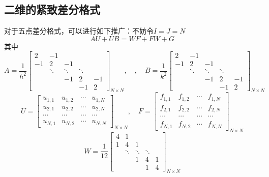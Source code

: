 \documentclass[fontset=mac]{ctexart}
\begin{document}
	\subsection{二维的紧致差分格式}
	对于五点差分格式，可以进行如下推广：不妨令$I=J=N$
	$$
	A U+U B=W F+F W+G
	$$
	其中
	$$
	A=\frac{1}{h^{2}}\left[\begin{array}{ccccc}
		2 & -1 & & & \\
		 -1 & 2 & -1 & & \\ 
		 & \ddots & \ddots & \ddots & \\ 
		 & & -1 & 2 & -1 \\
		  & & & -1 & 2\end{array}
	  \right]_{N \times N}, \quad, 
	  \quad B=\frac{1}{k^{2}}\left[\begin{array}{ccccc}
	  	2 & -1 & & & \\
	  	 -1 & 2 & -1 & & \\
	  	  & \ddots & \ddots & \ddots & \\
	  	   & & -1 & 2 & -1 \\ 
	  	   & & & -1 & 2
  	   \end{array}\right]_{N \times N}
	$$
	$$
	U=\left[\begin{array}{cccc}u_{1,1} & u_{1,2} & \cdots & u_{1, N} \\ u_{2,1} & u_{2,2} & \cdots & u_{2, N} \\ \cdots & \cdots & \cdots & \cdots \\ u_{N, 1} & u_{N, 2} & \cdots & u_{N, N}\end{array}\right]_{N \times N}, \quad F=\left[\begin{array}{ccccc}f_{1,1} & f_{1,2} & \cdots & f_{1, N} \\ f_{2,1} & f_{2,2} & \cdots & f_{2, N} \\ \cdots & \cdots & \cdots & \cdots \\ f_{N, 1} & f_{N, 2} & \cdots & f_{N, N}\end{array}\right]_{N \times N}
	$$
	$$
	W=\frac{1}{12}\left[\begin{array}{ccccc}4 & 1 & & & \\ 1 & 4 & 1 & & \\ & \ddots & \ddots & \ddots & \\ & & 1 & 4 & 1 \\ & & & 1 & 4\end{array}\right]_{N \times N}
	$$
\end{document}
